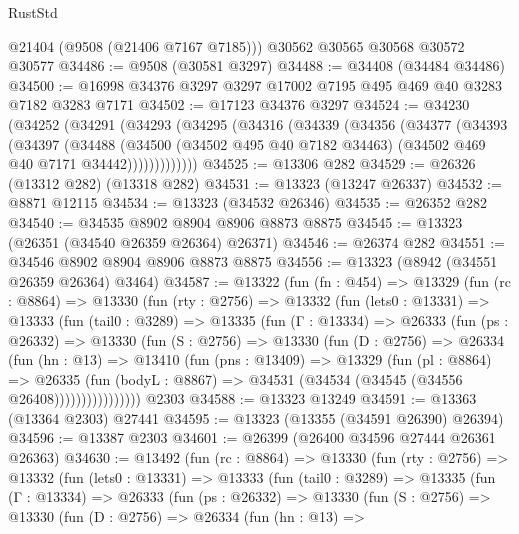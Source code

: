 \begin{lexlean}{RustStd}
\begin{coremodule}
      @21404
      (@9508 (@21406 @7167 @7185)))
    @30562
    @30565
    @30568
    @30572
    @30577
@34486 := @9508 (@30581 @3297)
@34488 := @34408 (@34484 @34486)
@34500 := @16998 @34376 @3297 @3297 @17002 @7195 @495 @469 @40 @3283 @7182 @3283 @7171
@34502 := @17123 @34376 @3297
@34524 := @34230
    (@34252
      (@34291
        (@34293
          (@34295
            (@34316
              (@34339
                (@34356
                  (@34377
                    (@34393
                      (@34397
                        (@34488
                          (@34500
                            (@34502 @495 @40 @7182 @34463)
                            (@34502 @469 @40 @7171 @34442)))))))))))))
@34525 := @13306 @282
@34529 := @26326 (@13312 @282) (@13318 @282)
@34531 := @13323 (@13247 @26337)
@34532 := @8871 @12115
@34534 := @13323 (@34532 @26346)
@34535 := @26352 @282
@34540 := @34535 @8902 @8904 @8906 @8873 @8875
@34545 := @13323 (@26351 (@34540 @26359 @26364) @26371)
@34546 := @26374 @282
@34551 := @34546 @8902 @8904 @8906 @8873 @8875
@34556 := @13323 (@8942 (@34551 @26359 @26364) @3464)
@34587 := @13322
    (fun (fn : @454) =>
    @13329
      (fun (rc : @8864) =>
      @13330
        (fun (rty : @2756) =>
        @13332
          (fun (lets0 : @13331) =>
          @13333
            (fun (tail0 : @3289) =>
            @13335
              (fun (Γ : @13334) =>
              @26333
                (fun (ps : @26332) =>
                @13330
                  (fun (S : @2756) =>
                  @13330
                    (fun (D : @2756) =>
                    @26334
                      (fun (hn : @13) =>
                      @13410
                        (fun (pns : @13409) =>
                        @13329
                          (fun (pl : @8864) =>
                          @26335
                            (fun (bodyL : @8867) =>
                            @34531 (@34534 (@34545 (@34556 @26408))))))))))))))))
    @2303
@34588 := @13323 @13249
@34591 := @13363 (@13364 @2303) @27441
@34595 := @13323 (@13355 (@34591 @26390) @26394)
@34596 := @13387 @2303
@34601 := @26399 (@26400 @34596 @27444 @26361 @26363)
@34630 := @13492
    (fun (rc : @8864) =>
    @13330
      (fun (rty : @2756) =>
      @13332
        (fun (lets0 : @13331) =>
        @13333
          (fun (tail0 : @3289) =>
          @13335
            (fun (Γ : @13334) =>
            @26333
              (fun (ps : @26332) =>
              @13330
                (fun (S : @2756) =>
                @13330
                  (fun (D : @2756) =>
                  @26334
                    (fun (hn : @13) =>

\end{coremodule}
\end{lexlean}
